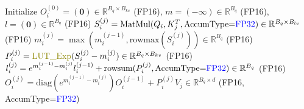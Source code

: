 \begin{algorithm*}[h]
\caption{On-chip computation of ours FP16 FlashAttention (different heads omitted)}
\label{alg:fp16-fa-on-chip}
Initialize $O_i^{(0)} = (\mathbf{0})\in \mathbb{R}^{B_q\times B_{kv}}$ (FP16), $m = (\mathbf{-\infty})\in\mathbb{R}^{B_q}$ (FP16), $l = (\mathbf{0})\in\mathbb{R}^{B_q}$ (FP16) \;
$S_i^{(j)} = \text{MatMul}(Q_i, K_j^T, \text{AccumType=\textcolor{blue}{FP32}}) \in \mathbb{R}^{B_q\times B_{lv}}$ (FP16) \;
$m_i^{(j)} = \max(m_i^{(j-1)}, \text{rowmax}(S_i^{(j)})) \in \mathbb{R}^{B_q}$ (FP16) \;
$P_i^{(j)} = \text{\textcolor{olive}{LUT\_Exp}}(S_i^{(j)} - m_i^{(j)}) \in \mathbb{R}^{B_q\times B_{kv}}$ (FP16) \;
$l_i^{(j)} = e^{m_i^{(j-1)}-m_i^{(j)}}l_i^{(j-1)} + \text{rowsum}(P_i^{(j)},\text{AccumType=\textcolor{blue}{FP32}}) \in \mathbb{R}^{B_q}$ (FP16) \;
$O_i^{(j)} = \mathrm{diag}(e^{m_i^{(j-1)}-m_i^{(j)}})O_i^{(j-1)}+P_i^{(j)}V_j \in \mathbb{R}^{B_q\times d}$ (FP16, AccumType=\textcolor{blue}{FP32}) \;
\end{algorithm*}




